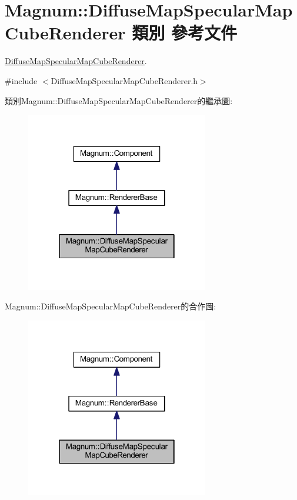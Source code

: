 \hypertarget{class_magnum_1_1_diffuse_map_specular_map_cube_renderer}{}\section{Magnum\+:\+:Diffuse\+Map\+Specular\+Map\+Cube\+Renderer 類別 參考文件}
\label{class_magnum_1_1_diffuse_map_specular_map_cube_renderer}


\hyperlink{class_magnum_1_1_diffuse_map_specular_map_cube_renderer}{Diffuse\+Map\+Specular\+Map\+Cube\+Renderer}.  




{\ttfamily \#include $<$Diffuse\+Map\+Specular\+Map\+Cube\+Renderer.\+h$>$}



類別\+Magnum\+:\+:Diffuse\+Map\+Specular\+Map\+Cube\+Renderer的繼承圖\+:\nopagebreak
\begin{figure}[H]
\begin{center}
\leavevmode
\includegraphics[width=226pt]{class_magnum_1_1_diffuse_map_specular_map_cube_renderer__inherit__graph}
\end{center}
\end{figure}


Magnum\+:\+:Diffuse\+Map\+Specular\+Map\+Cube\+Renderer的合作圖\+:\nopagebreak
\begin{figure}[H]
\begin{center}
\leavevmode
\includegraphics[width=226pt]{class_magnum_1_1_diffuse_map_specular_map_cube_renderer__coll__graph}
\end{center}
\end{figure}
